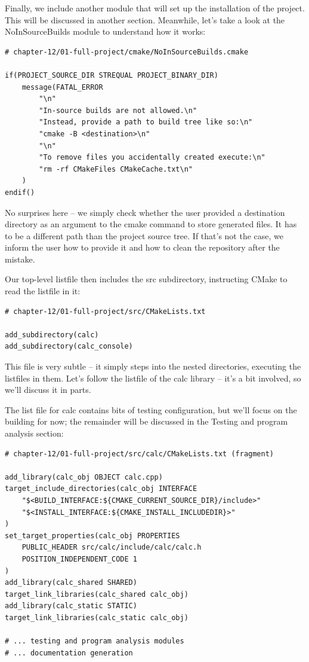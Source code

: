 Finally, we include another module that will set up the installation of the project. This will be discussed in another section. Meanwhile, let's take a look at the NoInSourceBuilds module to understand how it works:

\begin{lstlisting}[style=styleCMake]
# chapter-12/01-full-project/cmake/NoInSourceBuilds.cmake

if(PROJECT_SOURCE_DIR STREQUAL PROJECT_BINARY_DIR)
	message(FATAL_ERROR
		"\n"
		"In-source builds are not allowed.\n"
		"Instead, provide a path to build tree like so:\n"
		"cmake -B <destination>\n"
		"\n"
		"To remove files you accidentally created execute:\n"
		"rm -rf CMakeFiles CMakeCache.txt\n"
	)
endif()
\end{lstlisting}

No surprises here – we simply check whether the user provided a destination directory as an argument to the cmake command to store generated files. It has to be a different path than the project source tree. If that's not the case, we inform the user how to provide it and how to clean the repository after the mistake.

Our top-level listfile then includes the src subdirectory, instructing CMake to read the listfile in it:

\begin{lstlisting}[style=styleCMake]
# chapter-12/01-full-project/src/CMakeLists.txt

add_subdirectory(calc)
add_subdirectory(calc_console)
\end{lstlisting}

This file is very subtle – it simply steps into the nested directories, executing the listfiles in them. Let's follow the listfile of the calc library – it's a bit involved, so we'll discuss it in parts.


The list file for calc contains bits of testing configuration, but we'll focus on the building for now; the remainder will be discussed in the Testing and program analysis section:

\begin{lstlisting}[style=styleCMake]
# chapter-12/01-full-project/src/calc/CMakeLists.txt (fragment)

add_library(calc_obj OBJECT calc.cpp)
target_include_directories(calc_obj INTERFACE
	"$<BUILD_INTERFACE:${CMAKE_CURRENT_SOURCE_DIR}/include>"
	"$<INSTALL_INTERFACE:${CMAKE_INSTALL_INCLUDEDIR}>"
)
set_target_properties(calc_obj PROPERTIES
	PUBLIC_HEADER src/calc/include/calc/calc.h
	POSITION_INDEPENDENT_CODE 1
)
add_library(calc_shared SHARED)
target_link_libraries(calc_shared calc_obj)
add_library(calc_static STATIC)
target_link_libraries(calc_static calc_obj)

# ... testing and program analysis modules
# ... documentation generation
\end{lstlisting}

